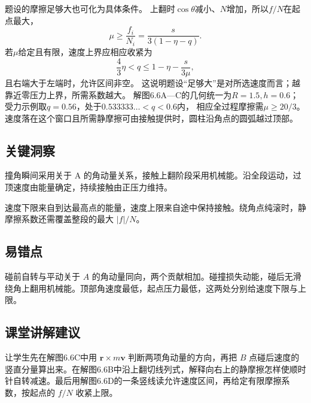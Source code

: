 \documentclass[UTF8,fontset=fandol,a4paper,11pt]{ctexart}
\begin{document}
题设的摩擦足够大也可化为具体条件。
上翻时$\cos\theta$减小、$N$增加，所以$f/N$在起点最大，
\[
\mu\geq\frac{f_i}{N_i}
=\frac{s}{3(1-\eta-q)}.
\]
若$\mu$给定且有限，速度上界应相应收紧为
\[
\frac43\eta<q\leq1-\eta-\frac{s}{3\mu},
\]
且右端大于左端时，允许区间非空。
这说明题设“足够大”是对所选速度而言；越靠近零压力上界，所需系数越大。
解图6.6A—C的几何统一为$R=1.5,h=0.6$；
受力示例取$q=0.56$，处于$0.533333\ldots<q<0.6$内，
相应全过程摩擦需$\mu\geq20/3$。
速度落在这个窗口且所需静摩擦可由接触提供时，圆柱沿角点的圆弧越过顶部。




\subsection*{关键洞察}

撞角瞬间采用关于 A 的角动量关系，接触上翻阶段采用机械能。沿全段运动，过顶速度由能量确定，持续接触由正压力维持。

速度下限来自到达最高点的能量，速度上限来自途中保持接触。绕角点纯滚时，静摩擦系数还需覆盖整段的最大 $|f|/N$。



\subsection*{易错点}

碰前自转与平动关于 $A$ 的角动量同向，两个贡献相加。碰撞损失动能，碰后无滑绕角上翻用机械能。顶部角速度最低，起点压力最低，这两处分别给速度下限与上限。



\subsection*{课堂讲解建议}

让学生先在解图6.6C中用 $\boldsymbol r\times m\boldsymbol v$ 判断两项角动量的方向，再把 $B$ 点碰后速度的竖直分量算出来。在解图6.6B中沿上翻切线列式，解释向右上的静摩擦怎样使顺时针自转减速。最后用解图6.6D的一条竖线读允许速度区间，再给定有限摩擦系数，按起点的 $f/N$ 收紧上限。



\end{document}

